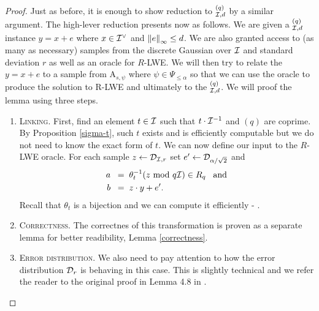 \begin{proof}
	Just as before, it is enough to show reduction to $^{(q)}_{\mathcal{I},d}$ by a similar argument. The high-lever reduction presents now as follows. We are given a $_{\mathcal{I}, d}^{(q)}$ instance $y = x + e$ where $x \in \mathcal{I}^{\vee}$ and $\norm{e}_{\infty} \leq d$. We are also granted access to (as many as necessary) samples from the discrete Gaussian over $\mathcal{I}$ and standard deviation $r$ as well as an oracle for $R$-LWE. We will then try to relate the $y = x + e$ to a sample from A$_{s, \psi}$ where $\psi \in \Psi_{\leq \alpha}$ so that we can use the oracle to produce the solution to R-LWE and ultimately to the $^{(q)}_{\mathcal{I},d}$. We will proof the lemma using three steps.

	\begin{enumerate}
		\item \textsc{Linking.} First, find an element $t \in \mathcal{I}$ such that $t \cdot \mathcal{I}^{-1}$ and $(q)$ are coprime. By Proposition \ref{sigma-t}, such $t$ exists and is efficiently computable but we do not need to know the exact form of $t$. We can now define our input to the $R$-LWE oracle. For each sample $z \leftarrow \mathcal{D}_{\mathcal{I}, r}$ set $e' \leftarrow \mathcal{D}_{\alpha/\sqrt{2}}$ and 
			\begin{align*}
				a \; \; = & \; \; \theta_t^{-1}(z \text{ mod } q\mathcal{I}) \in R_q \; \; \;\text{and} \\
				b \; \; = & \; \; z \cdot y + e'.
			\end{align*}
			Recall that $\theta_t$ is a bijection and we can compute it efficiently - \cite{toolkit}.
		\item \textsc{Correctness.} The correctnes of this transformation is proven as a separate lemma for better readibility, Lemma \ref{correctness}.
		\item \textsc{Error distribution.} We also need to pay attention to how the error distribution $\mathcal{D}_r$ is behaving in this case. This is slightly technical and we refer the reader to the original proof in Lemma 4.8 in \cite{ring-lwe}.
	\end{enumerate}
\end{proof}

